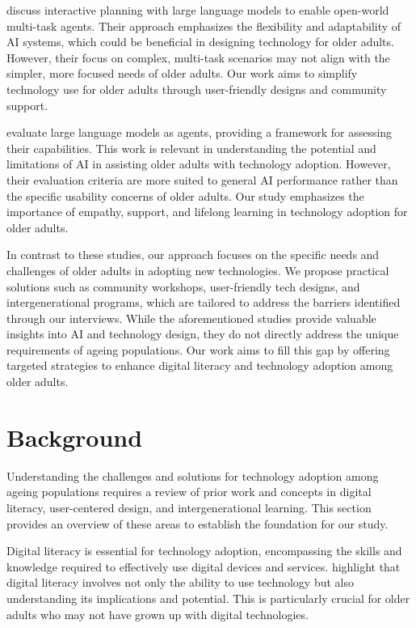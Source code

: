 \documentclass{article} %
\begin{document}
\citet{wang2023describe} discuss interactive planning with large language models to enable open-world multi-task agents. Their approach emphasizes the flexibility and adaptability of AI systems, which could be beneficial in designing technology for older adults. However, their focus on complex, multi-task scenarios may not align with the simpler, more focused needs of older adults. Our work aims to simplify technology use for older adults through user-friendly designs and community support.

\citet{liu2023agentbench} evaluate large language models as agents, providing a framework for assessing their capabilities. This work is relevant in understanding the potential and limitations of AI in assisting older adults with technology adoption. However, their evaluation criteria are more suited to general AI performance rather than the specific usability concerns of older adults. Our study emphasizes the importance of empathy, support, and lifelong learning in technology adoption for older adults.

In contrast to these studies, our approach focuses on the specific needs and challenges of older adults in adopting new technologies. We propose practical solutions such as community workshops, user-friendly tech designs, and intergenerational programs, which are tailored to address the barriers identified through our interviews. While the aforementioned studies provide valuable insights into AI and technology design, they do not directly address the unique requirements of ageing populations. Our work aims to fill this gap by offering targeted strategies to enhance digital literacy and technology adoption among older adults.

\section{Background}
\label{sec:background}

Understanding the challenges and solutions for technology adoption among ageing populations requires a review of prior work and concepts in digital literacy, user-centered design, and intergenerational learning. This section provides an overview of these areas to establish the foundation for our study.

Digital literacy is essential for technology adoption, encompassing the skills and knowledge required to effectively use digital devices and services. \citet{park2023generative} highlight that digital literacy involves not only the ability to use technology but also understanding its implications and potential. This is particularly crucial for older adults who may not have grown up with digital technologies.
\end{document}

